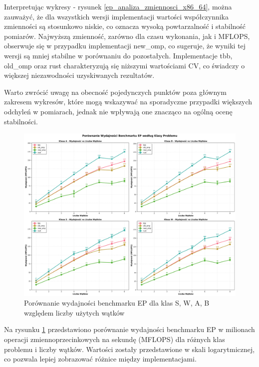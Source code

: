 Interpretując wykresy - rysunek \ref{ep_analiza_zmiennosci_x86_64}, można zauważyć, że dla wszystkich wersji implementacji wartości współczynnika zmienności są stosunkowo niskie, co oznacza wysoką powtarzalność i stabilność pomiarów. Najwyższą zmienność, zarówno dla czasu wykonania, jak i MFLOPS, obserwuje się w przypadku implementacji new\_omp, co sugeruje, że wyniki tej wersji są mniej stabilne w porównaniu do pozostałych. Implementacje tbb, old\_omp oraz rust charakteryzują się niższymi wartościami CV, co świadczy o większej niezawodności uzyskiwanych rezultatów.

Warto zwrócić uwagę na obecność pojedynczych punktów poza głównym zakresem wykresów, które mogą wskazywać na sporadyczne przypadki większych odchyleń w pomiarach, jednak nie wpływają one znacząco na ogólną ocenę stabilności.

\begin{figure}[H]
    \centering
    \includegraphics[width=\textwidth]{analiza/images/parallel/ep/x86/ep_porownanie_wydajnosci.png}
    \caption{Porównanie wydajności benchmarku EP dla klas S, W, A, B względem liczby użytych wątków}
    \label{ep_porownanie_wydajnosci_x86_64}
\end{figure}
Na rysunku \ref{ep_porownanie_wydajnosci_x86_64} przedstawiono porównanie wydajności benchmarku EP w milionach operacji zmiennoprzecinkowych na sekundę (MFLOPS) dla różnych klas problemu i liczby wątków. Wartości zostały przedstawione w skali logarytmicznej, co pozwala lepiej zobrazować różnice między implementacjami.

